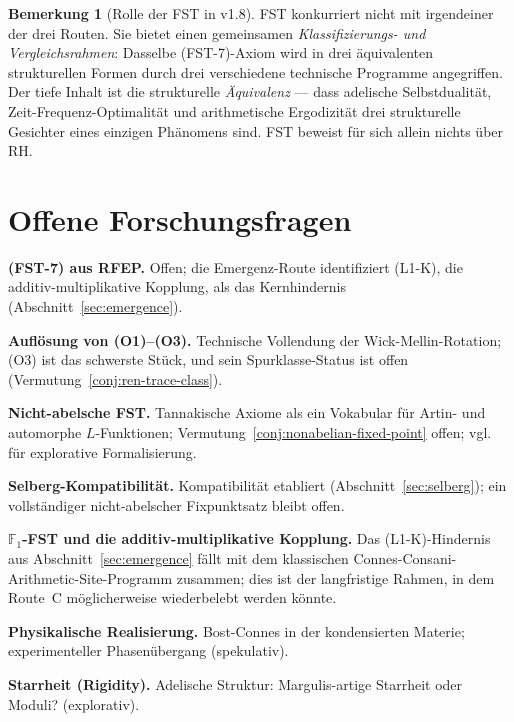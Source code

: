 \documentclass[11pt,a4paper]{article}
\theoremstyle{plain}
\theoremstyle{definition}
\newtheorem{remark}[theorem]{Bemerkung}
\newcommand{\F}{\mathbb{F}}
\begin{document}
\begin{remark}[Rolle der FST in v1.8]\label{rem:fst-role-v07}
FST konkurriert nicht mit irgendeiner der drei Routen. Sie bietet einen
gemeinsamen \emph{Klassifizierungs- und Vergleichsrahmen}: Dasselbe
(FST-7)-Axiom wird in drei äquivalenten strukturellen Formen durch drei
verschiedene technische Programme angegriffen. Der tiefe Inhalt ist die
strukturelle \emph{Äquivalenz} --- dass adelische Selbstdualität,
Zeit-Frequenz-Optimalität und arithmetische Ergodizität drei
strukturelle Gesichter eines einzigen Phänomens sind. FST beweist
für sich allein nichts über RH.
\end{remark}

\section{Offene Forschungsfragen}
\label{sec:ofq}

\begin{description}[style=nextline,leftmargin=*,labelwidth=3.5em]
\item[(OFQ1)] \textbf{(FST-7) aus RFEP.} Offen; die Emergenz-Route
  identifiziert (L1-K), die additiv-multiplikative Kopplung, als das
  Kernhindernis (Abschnitt~\ref{sec:emergence}).
\item[(OFQ2)] \textbf{Auflösung von (O1)--(O3).} Technische
  Vollendung der Wick-Mellin-Rotation; (O3) ist das schwerste Stück,
  und sein Spurklasse-Status ist offen (Vermutung~\ref{conj:ren-trace-class}).
\item[(OFQ3)] \textbf{Nicht-abelsche FST.} Tannakische Axiome als ein
  Vokabular für Artin- und automorphe $L$-Funktionen;
  Vermutung~\ref{conj:nonabelian-fixed-point} offen;
  vgl. \cite{TannakianAxioms} für explorative Formalisierung.
\item[(OFQ4)] \textbf{Selberg-Kompatibilität.} Kompatibilität
  etabliert (Abschnitt~\ref{sec:selberg}); ein vollständiger nicht-abelscher
  Fixpunktsatz bleibt offen.
\item[(OFQ5)] \textbf{$\F_1$-FST und die additiv-multiplikative Kopplung.}
  Das (L1-K)-Hindernis aus Abschnitt~\ref{sec:emergence} fällt mit dem
  klassischen Connes-Consani-Arithmetic-Site-Programm zusammen;
  dies ist der langfristige Rahmen, in dem Route~C möglicherweise
  wiederbelebt werden könnte.
\item[(OFQ6)] \textbf{Physikalische Realisierung.} Bost-Connes in der
  kondensierten Materie; experimenteller Phasenübergang (spekulativ).
\item[(OFQ7)] \textbf{Starrheit (Rigidity).} Adelische Struktur:
  Margulis-artige Starrheit oder Moduli? (explorativ).
\end{description}
\end{document}
